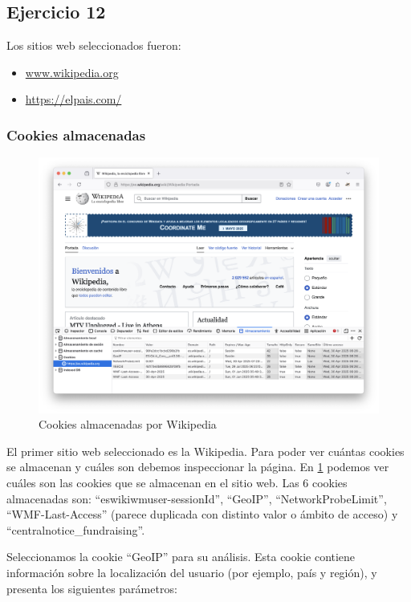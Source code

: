 \subsection{Ejercicio 12}
\graphicspath{ {img/12} }

Los sitios web seleccionados fueron:
\begin{itemize}
    \item \url{www.wikipedia.org}
    \item \url{https://elpais.com/}
\end{itemize}

\subsubsection{Cookies almacenadas}

\begin{figure}[H]
    \centering
    \includegraphics[width=\textwidth]{cookies_wiki.png}
    \caption{Cookies almacenadas por Wikipedia}
    \label{fig:cookies_wiki}
\end{figure}

El primer sitio web seleccionado es la Wikipedia. Para poder ver cuántas cookies se almacenan y cuáles son debemos inspeccionar la página. En \ref{fig:cookies_wiki} podemos ver cuáles son las cookies que se almacenan en el sitio web. Las 6 cookies almacenadas son: ``eswikiwmuser-sessionId'', ``GeoIP'', ``NetworkProbeLimit'', ``WMF-Last-Access'' (parece duplicada con distinto valor o ámbito de acceso) y ``centralnotice\_fundraising''.

Seleccionamos la cookie ``GeoIP'' para su análisis. Esta cookie contiene información sobre la localización del usuario (por ejemplo, país y región), y presenta los siguientes parámetros: 

